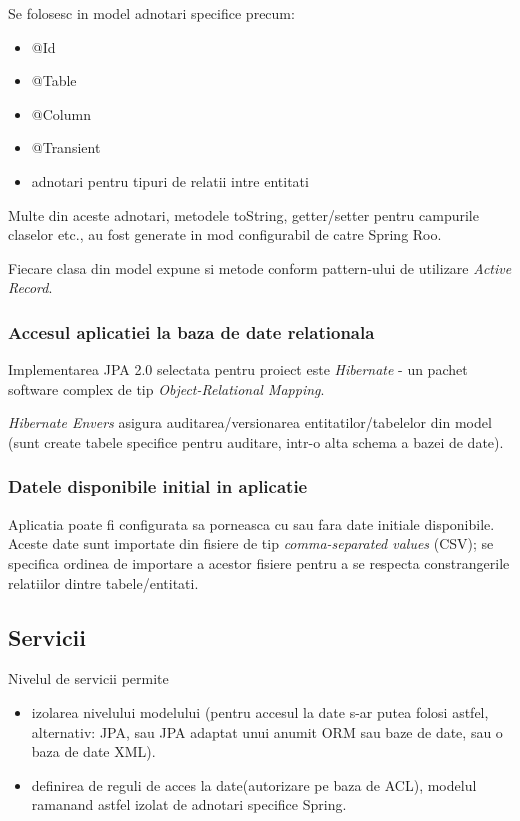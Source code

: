 Se folosesc in model adnotari specifice precum:
\begin{itemize}
  \item @Id
  \item @Table
  \item @Column
  \item @Transient
  \item adnotari pentru tipuri de relatii intre entitati %
\end{itemize}

Multe din aceste adnotari, metodele toString, 
getter/setter pentru campurile claselor etc., 
au fost generate in mod configurabil de catre Spring Roo.

Fiecare clasa din model expune si metode conform pattern-ului de utilizare \emph{Active Record}. 

\subsubsection{Accesul aplicatiei la baza de date relationala}
Implementarea JPA 2.0 selectata pentru proiect este \emph{Hibernate} - 
un pachet software complex de tip \emph{Object-Relational Mapping}.

\emph{Hibernate Envers} asigura auditarea/versionarea entitatilor/tabelelor din
model (sunt create tabele specifice pentru auditare, intr-o alta schema a bazei
de date).

\subsubsection{Datele disponibile initial in aplicatie}
Aplicatia poate fi configurata sa porneasca cu sau fara date initiale
disponibile.
Aceste date sunt importate din fisiere de tip \emph{comma-separated values} (CSV); 
se specifica ordinea de importare a acestor fisiere pentru a se respecta constrangerile relatiilor
dintre tabele/entitati.

\subsection{Servicii}
Nivelul de servicii permite 
\begin{itemize}
\item 
izolarea nivelului modelului (pentru accesul la
date s-ar putea folosi astfel, alternativ: JPA, sau JPA adaptat unui anumit ORM sau
baze de date, sau o baza de date XML).
\item
definirea de reguli de acces la date(autorizare pe baza de ACL), modelul
ramanand astfel izolat de adnotari specifice Spring.
\end{itemize} 

